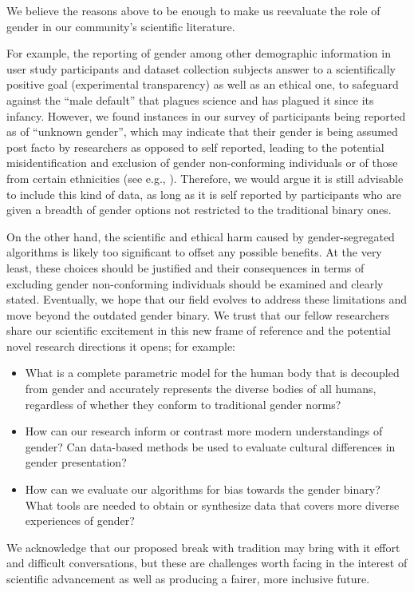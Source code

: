 \documentclass[sigconf,review,balance=false]{acmart}
\begin{document}
We believe the reasons above to be enough to make us reevaluate the role of
gender in our community's scientific literature.

For example, the reporting of gender among other demographic information in user
study participants and dataset collection subjects answer to a scientifically
positive goal (experimental transparency) as well as an ethical one, to
safeguard against the “male default” that plagues science and has plagued it
since its infancy. However, we found instances in our survey of participants
being reported as of “unknown gender”, which may indicate that their gender is
being assumed post facto by researchers as opposed to self reported, leading to
the potential misidentification and exclusion of gender non-conforming
individuals or of those from certain ethnicities (see e.g.,
\cite{santamaria2018comparison,buolamwini2018gender}). Therefore, we would argue
it is still advisable to include this kind of data, as long as it is self
reported by participants who are given a breadth of gender options not
restricted to the traditional binary ones.

On the other hand, the scientific and ethical harm caused by gender-segregated
algorithms is likely too significant to offset any possible benefits. At the
very least, these choices should be justified and their consequences in terms of
excluding gender non-conforming individuals should be examined and clearly
stated. Eventually, we hope that our field evolves to address these limitations
and move beyond the outdated gender binary. We trust that our fellow researchers
share our scientific excitement in this new frame of reference and the potential
novel research directions it opens; for example:
\begin{itemize}
    \item What is a complete parametric model for the human body that is
    decoupled from gender and accurately represents the diverse bodies of all
    humans, regardless of whether they conform to traditional gender norms?
    \item How can our research inform or contrast more modern understandings of
    gender? Can data-based methods be used to evaluate cultural differences in
    gender presentation?
    \item How can we evaluate our algorithms for bias towards the gender binary?
    What tools are needed to obtain or synthesize data that covers more diverse
    experiences of gender?
\end{itemize}

We acknowledge that our proposed break with tradition may bring with it effort
and difficult conversations, but these are challenges worth facing in the
interest of scientific advancement as well as producing a fairer, more inclusive
future.



\end{document}
